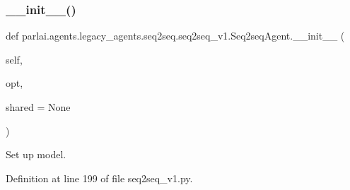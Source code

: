 \subsubsection{\texorpdfstring{\+\_\+\+\_\+init\+\_\+\+\_\+()}{\_\_init\_\_()}}
{\footnotesize\ttfamily def parlai.\+agents.\+legacy\+\_\+agents.\+seq2seq.\+seq2seq\+\_\+v1.\+Seq2seq\+Agent.\+\_\+\+\_\+init\+\_\+\+\_\+ (\begin{DoxyParamCaption}\item[{}]{self,  }\item[{}]{opt,  }\item[{}]{shared = {\ttfamily None} }\end{DoxyParamCaption})}

\begin{DoxyVerb}Set up model.
\end{DoxyVerb}
 

Definition at line 199 of file seq2seq\+\_\+v1.\+py.


